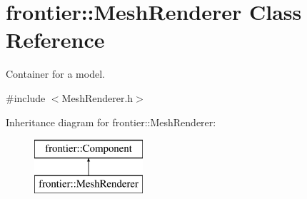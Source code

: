 \hypertarget{classfrontier_1_1_mesh_renderer}{}\section{frontier\+:\+:Mesh\+Renderer Class Reference}
\label{classfrontier_1_1_mesh_renderer}


Container for a model.  




{\ttfamily \#include $<$Mesh\+Renderer.\+h$>$}

Inheritance diagram for frontier\+:\+:Mesh\+Renderer\+:\begin{figure}[H]
\begin{center}
\leavevmode
\includegraphics[height=2.000000cm]{classfrontier_1_1_mesh_renderer}
\end{center}
\end{figure}
